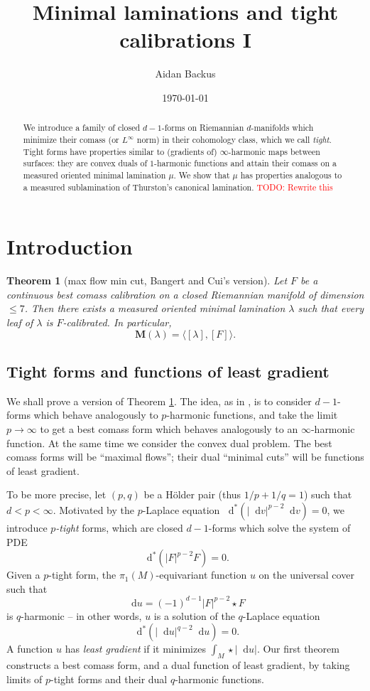 \documentclass[reqno,11pt]{amsart}
\title[Laminations and calibrations I]{Minimal laminations and tight calibrations I}
\author{Aidan Backus}
\date{\today}
\newcommand*\dif{\mathop{}\!\mathrm{d}}
\newcommand{\Mass}{\mathbf M}
\newcommand{\dfn}[1]{\emph{#1}\index{#1}}
\newtheorem{theorem}{Theorem}[section]
\theoremstyle{definition}
\numberwithin{equation}{section}
\newcommand\todo[1]{\textcolor{red}{TODO: #1}}
\begin{document}
\begin{abstract}
We introduce a family of closed $d-1$-forms on Riemannian $d$-manifolds which minimize their comass (or $L^\infty$ norm) in their cohomology class, which we call \dfn{tight}.
Tight forms have properties similar to (gradients of) $\infty$-harmonic maps between surfaces: they are convex duals of $1$-harmonic functions and attain their comass on a measured oriented minimal lamination $\mu$.
We show that $\mu$ has properties analogous to a measured sublamination of Thurston's canonical lamination.
\todo{Rewrite this}
\end{abstract}

\maketitle

\section{Introduction}
\begin{theorem}[max flow min cut, Bangert and Cui's version]\label{BangertCui}
Let $F$ be a continuous best comass calibration on a closed Riemannian manifold of dimension $\leq 7$.
Then there exists a measured oriented minimal lamination $\lambda$ such that every leaf of $\lambda$ is $F$-calibrated.
In particular, 
$$\Mass(\lambda) = \langle [\lambda], [F]\rangle.$$
\end{theorem}

\subsection{Tight forms and functions of least gradient}
We shall prove a version of Theorem \ref{BangertCui}.
The idea, as in \cite{daskalopoulos2020transverse}, is to consider $d - 1$-forms which behave analogously to $p$-harmonic functions, and take the limit $p \to \infty$ to get a best comass form which behaves analogously to an $\infty$-harmonic function.
At the same time we consider the convex dual problem.
The best comass forms will be ``maximal flows''; their dual ``minimal cuts'' will be functions of least gradient.

To be more precise, let $(p, q)$ be a H\"older pair (thus $1/p + 1/q = 1$) such that $d < p < \infty$.
Motivated by the $p$-Laplace equation $\dif^*(|\dif v|^{p - 2} \dif v) = 0$, we introduce \dfn{$p$-tight} forms, which are closed $d-1$-forms which solve the system of PDE
$$\dif^*(|F|^{p - 2} F) = 0.$$
Given a $p$-tight form, the $\pi_1(M)$-equivariant function $u$ on the universal cover such that
$$\dif u = (-1)^{d - 1} |F|^{p - 2} \star F$$
is $q$-harmonic -- in other words, $u$ is a solution of the $q$-Laplace equation 
$$\dif^*(|\dif u|^{q - 2} \dif u) = 0.$$
A function $u$ has \dfn{least gradient} if it minimizes $\int_M \star |\dif u|$.
Our first theorem constructs a best comass form, and a dual function of least gradient, by taking limits of $p$-tight forms and their dual $q$-harmonic functions.
\end{document}
